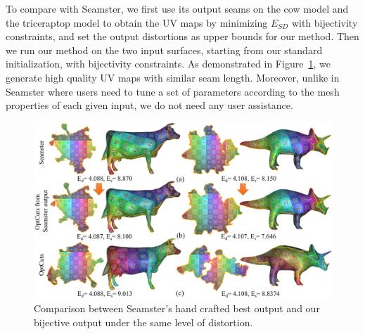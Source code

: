 To compare with Seamster, we first use its output seams on the cow model and the triceraptop model to obtain the UV maps by minimizing $E_{SD}$ with bijectivity constraints, and set the output distortions as upper bounds for our method. Then we run our method on the two input surfaces, starting from our standard initialization, with bijectivity constraints. As demonstrated in Figure~\ref{fig:comp_Seamster}, we generate high quality UV maps with similar seam length. Moreover, unlike in Seamster where users need to tune a set of parameters according to the mesh properties of each given input, we do not need any user assistance.  

\begin{figure}[!h]
\centering
\includegraphics[width=\linewidth]{fig/comp_Seamster.png}
\caption{Comparison between Seamster's hand crafted best output and our bijective output under the same level of distortion.}
\label{fig:comp_Seamster}
\end{figure}
